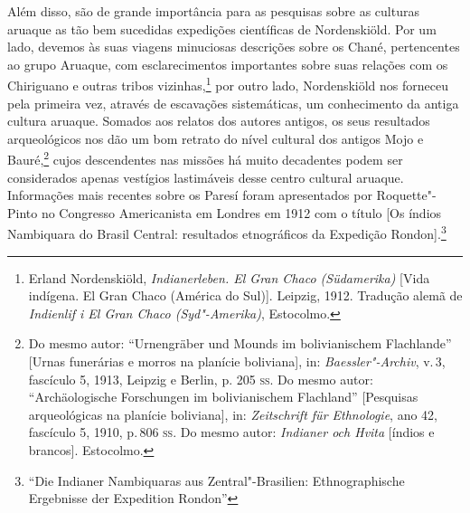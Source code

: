 Além disso, são de grande importância para as pesquisas sobre as
culturas aruaque as tão bem sucedidas expedições científicas de
Nordenskiöld. Por um lado, devemos às suas viagens minuciosas
descrições sobre os Chané, pertencentes ao grupo Aruaque, com
esclarecimentos importantes sobre suas relações com os Chiriguano e
outras tribos vizinhas,\footnote{Erland Nordenskiöld,
  \textit{Indianerleben. El Gran Chaco (Südamerika)} {[}Vida indígena. El
  Gran Chaco (América do Sul){]}. Leipzig, 1912. Tradução alemã de
  \textit{Indienlif i El Gran Chaco (Syd"-Amerika)}, Estocolmo.} por outro
lado, Nordenskiöld nos forneceu pela primeira vez, através de escavações
sistemáticas, um conhecimento da antiga cultura aruaque. Somados aos
relatos dos autores antigos, os seus resultados arqueológicos nos dão um
bom retrato do nível cultural dos antigos Mojo e Bauré,\footnote{Do mesmo
  autor: ``Urnengräber und Mounds im bolivianischem Flachlande''
  {[}Urnas funerárias e morros na planície boliviana{]}, in:
  \textit{Baessler"-Archiv}, v.\,3, fascículo 5, 1913, Leipzig e Berlin, p.
  205 \textsc{ss}. Do mesmo autor: ``Archäologische Forschungen im bolivianischem
  Flachland'' {[}Pesquisas arqueológicas na planície boliviana{]}, in:
  \textit{Zeitschrift für Ethnologie}, ano 42, fascículo 5, 1910, p.\,806
  \textsc{ss}. Do mesmo autor: \textit{Indianer och Hvita} {[}índios e brancos{]}.
  Estocolmo.} cujos descendentes nas missões há muito decadentes podem
ser considerados apenas vestígios lastimáveis desse centro cultural
aruaque. Informações mais recentes sobre os Paresí foram apresentados
por Roquette"-Pinto no Congresso Americanista em Londres em 1912 com o
título {[}Os índios Nambiquara do Brasil Central: resultados etnográficos da Expedição
Rondon{]}.\footnote{``Die Indianer Nambiquaras aus Zentral"-Brasilien:
Ethnographische Ergebnisse der Expedition Rondon''}

